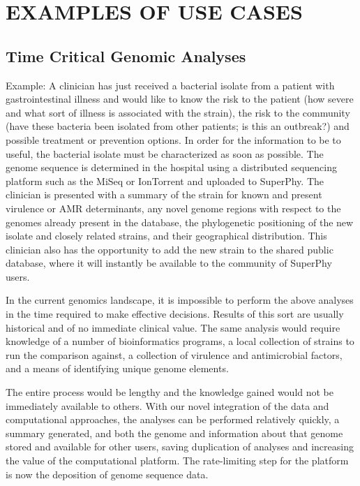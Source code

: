 \documentclass[a4paper,twoside]{article}
\begin{document}
{\section{\uppercase{Examples of Use Cases}}
\label{sec:cases}
\subsection{Time Critical Genomic Analyses}
Example: A clinician has just received a bacterial isolate from a patient with gastrointestinal illness and would like to know the risk to the patient (how severe and what sort of illness is associated with the strain), the risk to the community (have these bacteria been isolated from other patients; is this an outbreak?) and possible treatment or prevention options. In order for the information to be to useful, the bacterial isolate must be characterized as soon as possible. The genome sequence is determined in the hospital using a distributed sequencing platform such as the MiSeq or IonTorrent and uploaded to SuperPhy. The clinician is presented with a summary of the strain for known and present virulence or AMR determinants, any novel genome regions with respect to the genomes already present in the database, the phylogenetic positioning of the new isolate and closely related strains, and their geographical distribution. This clinician also has the opportunity to add the new strain to the shared public database, where it will instantly be available to the community of SuperPhy users.

In the current genomics landscape, it is impossible to perform the above analyses in the time required to make effective decisions. Results of this sort are usually historical and of no immediate clinical value. The same analysis would require knowledge of a number of bioinformatics programs, a local collection of strains to run the comparison against, a collection of virulence and antimicrobial factors, and a means of identifying unique genome elements.

The entire process would be lengthy and the knowledge gained would not be immediately available to others. With our novel integration of the data and computational approaches, the analyses can be performed relatively quickly, a summary generated, and both the genome and
information about that genome stored and available for other users, saving duplication of analyses and increasing the value of the computational platform. The rate-limiting step for the platform is now the deposition of genome sequence data.

}
\end{document}
